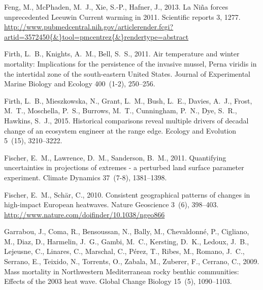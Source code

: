 \documentclass[a4paper,10pt,review]{elsarticle}
\begin{document}
\begin{thebibliography}{50}
Feng, M., McPhaden, M.~J., Xie, S.-P., Hafner, J., 2013. {La Ni{\~{n}}a forces
  unprecedented Leeuwin Current warming in 2011.} Scientific reports 3, 1277.
\newline\urlprefix\url{http://www.pubmedcentral.nih.gov/articlerender.fcgi?artid=3572450{\&}tool=pmcentrez{\&}rendertype=abstract}

Firth, L.~B., Knights, A.~M., Bell, S.~S., 2011. {Air temperature and winter
  mortality: Implications for the persistence of the invasive mussel, Perna
  viridis in the intertidal zone of the south-eastern United States}. Journal
  of Experimental Marine Biology and Ecology 400~(1-2), 250--256.

Firth, L.~B., Mieszkowska, N., Grant, L.~M., Bush, L.~E., Davies, A.~J., Frost,
  M.~T., Moschella, P.~S., Burrows, M.~T., Cunningham, P.~N., Dye, S.~R.,
  Hawkins, S.~J., 2015. {Historical comparisons reveal multiple drivers of
  decadal change of an ecosystem engineer at the range edge}. Ecology and
  Evolution 5~(15), 3210--3222.

Fischer, E.~M., Lawrence, D.~M., Sanderson, B.~M., 2011. {Quantifying
  uncertainties in projections of extremes - a perturbed land surface parameter
  experiment}. Climate Dynamics 37~(7-8), 1381--1398.

Fischer, E.~M., Sch{\"{a}}r, C., 2010. {Consistent geographical patterns of
  changes in high-impact European heatwaves}. Nature Geoscience 3~(6),
  398--403.
\newline\urlprefix\url{http://www.nature.com/doifinder/10.1038/ngeo866}

Garrabou, J., Coma, R., Bensoussan, N., Bally, M., Chevaldonn{\'{e}}, P.,
  Cigliano, M., Diaz, D., Harmelin, J.~G., Gambi, M.~C., Kersting, D.~K.,
  Ledoux, J.~B., Lejeusne, C., Linares, C., Marschal, C., P{\'{e}}rez, T.,
  Ribes, M., Romano, J.~C., Serrano, E., Teixido, N., Torrents, O., Zabala, M.,
  Zuberer, F., Cerrano, C., 2009. {Mass mortality in Northwestern Mediterranean
  rocky benthic communities: Effects of the 2003 heat wave}. Global Change
  Biology 15~(5), 1090--1103.


\end{thebibliography}
\end{document}
